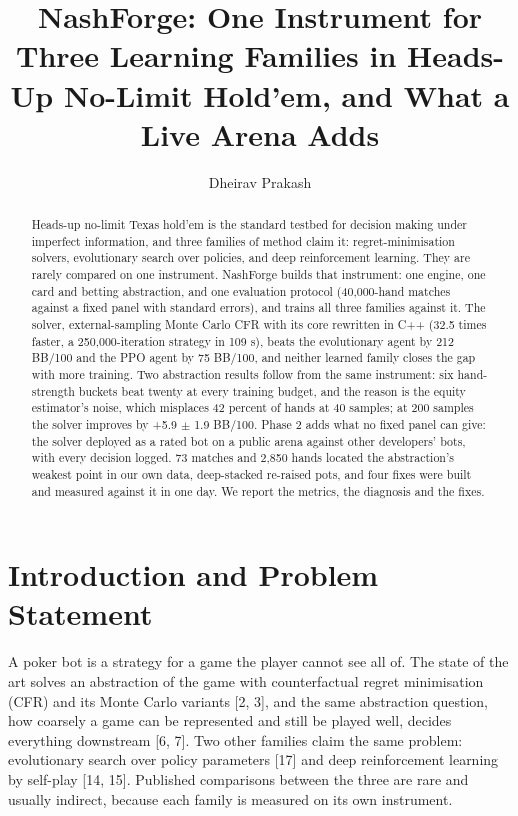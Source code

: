\documentclass[runningheads]{llncs}
\begin{document}
\title{NashForge: One Instrument for Three Learning Families in Heads-Up No-Limit Hold'em, and What a Live Arena Adds}
\author{Dheirav Prakash}
\maketitle
\begin{abstract}
Heads-up no-limit Texas hold'em is the standard testbed for decision making under imperfect information, and three families of method claim it: regret-minimisation solvers, evolutionary search over policies, and deep reinforcement learning. They are rarely compared on one instrument. NashForge builds that instrument: one engine, one card and betting abstraction, and one evaluation protocol (40,000-hand matches against a fixed panel with standard errors), and trains all three families against it. The solver, external-sampling Monte Carlo CFR with its core rewritten in C++ (32.5 times faster, a 250,000-iteration strategy in 109 s), beats the evolutionary agent by 212 BB/100 and the PPO agent by 75 BB/100, and neither learned family closes the gap with more training. Two abstraction results follow from the same instrument: six hand-strength buckets beat twenty at every training budget, and the reason is the equity estimator's noise, which misplaces 42 percent of hands at 40 samples; at 200 samples the solver improves by +5.9 $\pm$ 1.9 BB/100. Phase 2 adds what no fixed panel can give: the solver deployed as a rated bot on a public arena against other developers' bots, with every decision logged. 73 matches and 2,850 hands located the abstraction's weakest point in our own data, deep-stacked re-raised pots, and four fixes were built and measured against it in one day. We report the metrics, the diagnosis and the fixes.
\end{abstract}
\section{Introduction and Problem Statement}
A poker bot is a strategy for a game the player cannot see all of. The state of the art solves an abstraction of the game with counterfactual regret minimisation (CFR) and its Monte Carlo variants [2, 3], and the same abstraction question, how coarsely a game can be represented and still be played well, decides everything downstream [6, 7]. Two other families claim the same problem: evolutionary search over policy parameters [17] and deep reinforcement learning by self-play [14, 15]. Published comparisons between the three are rare and usually indirect, because each family is measured on its own instrument.
\end{document}

